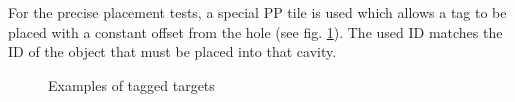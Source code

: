 For the precise placement tests, a special PP tile is used which allows a tag to be placed with a constant offset from the hole (see fig. \ref{fig:Tagged Targets}). The used ID matches the ID of the object that must be placed into that cavity.

\begin{figure}[h!]
	\begin{center}
		 \hfill
		 \hfill
		 \hfill
	\end{center}
	\caption{Examples of tagged targets}
	\label{fig:Tagged Targets}
\end{figure}




